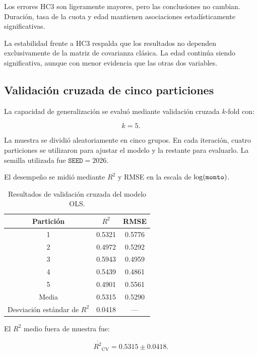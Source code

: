 Los errores HC3 son ligeramente mayores, pero las conclusiones no
cambian. Duración, tasa de la cuota y edad mantienen asociaciones
estadísticamente significativas.

La estabilidad frente a HC3 respalda que los resultados no dependen
exclusivamente de la matriz de covarianza clásica. La edad continúa
siendo significativa, aunque con menor evidencia que las otras dos
variables.

\subsection{Validación cruzada de cinco particiones}

La capacidad de generalización se evaluó mediante validación cruzada
\(k\)-fold con:

\[
k=5.
\]

La muestra se dividió aleatoriamente en cinco grupos. En cada iteración,
cuatro particiones se utilizaron para ajustar el modelo y la restante
para evaluarlo. La semilla utilizada fue \(\texttt{SEED}=2026\).

El desempeño se midió mediante \(R^2\) y RMSE en la escala de
\(\log(\texttt{monto})\).

\begin{table}[H]
    \centering
    \caption{Resultados de validación cruzada del modelo OLS.}
    \label{tab:cv-ols}

    \begin{tabular}{ccc}
        \toprule
        Partición & \(R^2\) & RMSE \\
        \midrule
        1 & \num{0.5321} & \num{0.5776} \\
        2 & \num{0.4972} & \num{0.5292} \\
        3 & \num{0.5943} & \num{0.4959} \\
        4 & \num{0.5439} & \num{0.4861} \\
        5 & \num{0.4901} & \num{0.5561} \\
        \midrule
        Media & \num{0.5315} & \num{0.5290} \\
        Desviación estándar de \(R^2\)
        & \num{0.0418}
        & --- \\
        \bottomrule
    \end{tabular}
\end{table}

El \(R^2\) medio fuera de muestra fue:

\[
\overline{R^2}_{\mathrm{CV}}
=
\num{0.5315}
\pm
\num{0.0418}.
\]

